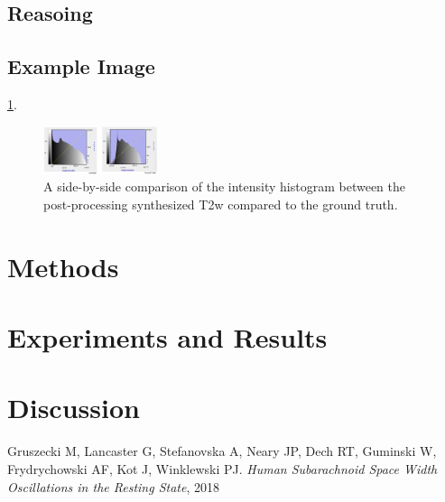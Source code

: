 \documentclass[conference]{IEEEtran}
\begin{document}
\subsection{Reasoing}
\lipsum[6]

\subsection{Example Image}
\lipsum[7] \ref{fig:example}.
\begin{figure}[h!]
    \centering
    \includegraphics[width=0.30\textwidth]{Histogram Comparison.png}
    \caption{A side-by-side comparison of the intensity histogram between the post-processing synthesized T2w compared to the ground truth.}
    \label{fig:example}
\end{figure}

\section{Methods}
\lipsum[8]

\section{Experiments and Results}
\lipsum[9]

\section{Discussion}
\lipsum[10]

\begin{thebibliography}{1}
Gruszecki M, Lancaster G, Stefanovska A, Neary JP, Dech RT, Guminski W, Frydrychowski AF, Kot J, Winklewski PJ. \emph{Human Subarachnoid Space Width Oscillations in the Resting State}, 2018
\end{thebibliography}
\end{document}
